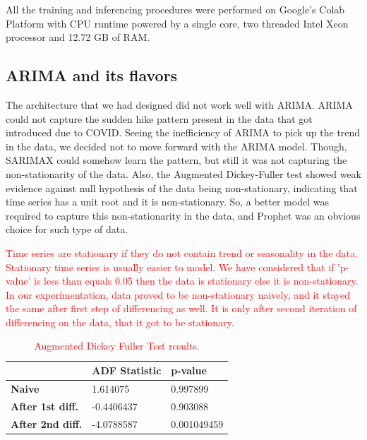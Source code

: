 \documentclass[times,twocolumn,final,authoryear]{elsarticle}
\begin{document}
	All the training and inferencing procedures were performed on Google's Colab Platform \cite{Colab} with CPU runtime powered by a single core, two threaded Intel Xeon processor and 12.72 GB of RAM.
	
	\subsection{ARIMA and its flavors}
	The architecture that we had designed did not work well with ARIMA. ARIMA could not capture the sudden hike pattern present in the data that got introduced due to COVID. Seeing the inefficiency of ARIMA to pick up the trend in the data, we decided not to move forward with the ARIMA model. Though, SARIMAX could somehow learn the pattern, but still it was not capturing the non-stationarity of the data. Also, the Augmented Dickey-Fuller test \cite{DF-Test} showed weak evidence against null hypothesis of the data being non-stationary, indicating that time series has a unit root and it is non-stationary. So, a better model was required to capture this non-stationarity in the data, and Prophet was an obvious choice for such type of data.
	
%	
	
	\textcolor{red}{Time series are stationary if they do not contain trend or seasonality in the data. Stationary time series is usually easier to model. We have considered that if 'p-value' is less than equals 0.05 then the data is stationary else it is non-stationary. In our experimentation, data proved to be non-stationary naively, and it stayed the same after first step of differencing as well. It is only after second iteration of differencing on the data, that it got to be stationary.}
	
	\begin{table}[h]
		\caption{\textcolor{red}{Augmented Dickey Fuller Test results.}}
		\label{ADF_tests}
		\centering
		\begin{tabular}{|l|l|l|}
			\hline
			\textbf{}                & \textbf{ADF Statistic} & \textbf{p-value} \\ \hline
			\textbf{Naive}           & 1.614075               & 0.997899         \\ \hline
			\textbf{After 1st diff.} & -0.4406437             & 0.903088         \\ \hline
			\textbf{After 2nd diff.} & -4.0788587             & 0.001049459      \\ \hline
		\end{tabular}
	\end{table}
\end{document}
